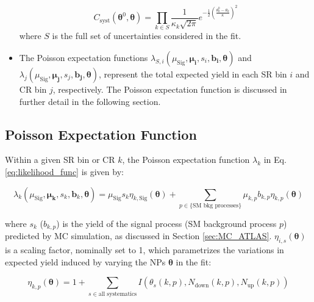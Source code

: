 \begin{itemize}
    \begin{equation}
    \label{eq:gaussian_np}
    C_\text{syst}(\boldsymbol{\theta}^0, \boldsymbol{\theta})= \prod_{k\in S} \frac{1}{\kappa_k\sqrt{2\pi}}e^{-\frac{1}{2}(\frac{\theta^0_k-\theta_k}{\kappa})^2}
    \end{equation}
    \noindent where \(S\) is the full set of uncertainties considered in the fit.
    
    \item The Poisson expectation functions \(\lambda_{S,i}(\mu_\text{Sig}, \boldsymbol{\mu_i}, s_i, \boldsymbol{b_i}, \boldsymbol{\theta})\) and \(\lambda_j(\mu_\text{Sig}, \boldsymbol{\mu_j}, s_j, \boldsymbol{b_j}, \boldsymbol{\theta})\), represent the total expected yield in each SR bin \(i\) and CR bin \(j\), respectively. The Poisson expectation function is discussed in further detail in the following section.
\end{itemize}

\subsection{Poisson Expectation Function}
\label{sec:poisson_exp}

Within a given SR bin or CR \(k\), the Poisson expectation function \(\lambda_k\) in Eq. \ref{eq:likelihood_func} is given by:
    
\begin{equation}
\label{eq:lambda}
        \lambda_k(\mu_\text{Sig}, \boldsymbol{\mu_k}, s_k, \boldsymbol{b}_k, \boldsymbol{\theta}) = \mu_\text{Sig}s_k\eta_{k, \text{Sig}}(\boldsymbol{\theta}) + \sum\limits_{p\in{\text{\{SM bkg processes\}}}} \mu_{k,p} b_{k,p}\eta_{k,p}(\boldsymbol{\theta})
\end{equation}
    
\noindent where \(s_k\) (\(b_{k,p}\)) is the yield of the signal process (SM background process \(p\)) predicted by MC simulation, as discussed in Section \ref{sec:MC_ATLAS}. \(\eta_{i,s}(\boldsymbol{\theta})\) is a scaling factor, nominally set to 1, which parametrizes the variations in expected yield induced by varying the NPs \(\boldsymbol{\theta}\) in the fit:

        \begin{equation}
            \label{eq:sigma}
            \eta_{k,p}(\boldsymbol{\theta}) = 1 + \sum_{s\in\text{all systematics}}I(\theta_s(k,p), N_\text{down}(k,p), N_\text{up}(k,p))
        \end{equation}

